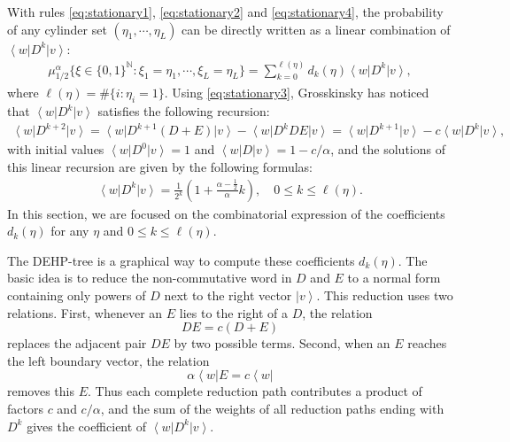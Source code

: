 \documentclass[12pt,a4paper]{amsart}
\newcommand{\bra}[1]{\left\langle #1\right|}
\newcommand{\ket}[1]{\left|#1\right\rangle}
\theoremstyle{remark}
\numberwithin{equation}{section} \numberwithin{theorem}{section}
\begin{document}
With rules \eqref{eq:stationary1}, \eqref{eq:stationary2} and \eqref{eq:stationary4}, the probability of any cylinder set $(\eta_1, \cdots, \eta_{L})$ can be directly written as a linear combination of $\bra{w}D^{k}\ket{v}$:
\begin{align*}
\mu_{1/2}^{\alpha}\{\xi\in\{0,1\}^{\mathbb{N}}:\xi_1=\eta_1, \cdots, \xi_L=\eta_L\}=\sum_{k=0}^{\ell(\eta)}d_k(\eta)\bra{w}D^{k}\ket{v},
\end{align*}
where $\ell(\eta)=\#\{i: \eta_i=1\}$. Using \eqref{eq:stationary3}, Grosskinsky \cite{Gro04} has noticed that $\bra{w}D^{k}\ket{v}$ satisfies the following recursion:
\begin{align*}
\bra{w}D^{k+2}\ket{v}=\bra{w}D^{k+1}(D+E)\ket{v}-\bra{w}D^{k}DE\ket{v}=\bra{w}D^{k+1}\ket{v}-c\bra{w}D^{k}\ket{v},
\end{align*}
with initial values $\bra{w}D^{0}\ket{v}=1$ and $\bra{w}D\ket{v}=1-c/\alpha$, and the solutions of this linear recursion are given by the following formulas:
\begin{align}
\label{eq:D_k}
\bra{w}D^{k}\ket{v}=\frac{1}{2^k}\left(1+\frac{\alpha-\frac12}{\alpha}k\right), \quad 0 \leq k \leq \ell(\eta). 
\end{align}
In this section, we are focused on the combinatorial expression of the coefficients $d_k(\eta)$ for any $\eta$ and $0 \leq k \leq \ell(\eta)$.

The DEHP-tree is a graphical way to compute these coefficients $d_k(\eta)$. 
The basic idea is to reduce the non-commutative word in $D$ and $E$ to a normal form containing only powers of $D$ next to the right vector $\ket{v}$. 
This reduction uses two relations. 
First, whenever an $E$ lies to the right of a $D$, the relation
\[
DE=c(D+E)
\]
replaces the adjacent pair $DE$ by two possible terms. 
Second, when an $E$ reaches the left boundary vector, the relation
\[
\alpha\bra{w}E=c\bra{w}
\]
removes this $E$. 
Thus each complete reduction path contributes a product of factors $c$ and $c/\alpha$, and the sum of the weights of all reduction paths ending with $D^k$ gives the coefficient of $\bra{w}D^k\ket{v}$.
\end{document}
